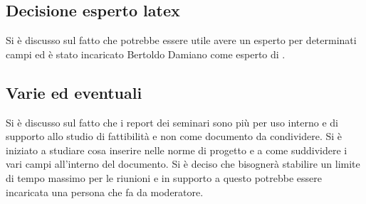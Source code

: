 \subsection*{Decisione esperto latex}
			Si è discusso sul fatto che potrebbe essere utile avere un esperto per determinati campi ed è stato incaricato Bertoldo Damiano come esperto di \glock{\LaTeX}.


\subsection*{Varie ed eventuali}
			Si è discusso sul fatto che i report dei seminari sono più per uso interno e di supporto allo studio di fattibilità e non come documento da condividere.
			Si è iniziato a studiare cosa inserire nelle norme di progetto e a come suddividere i vari campi all'interno del documento.
			Si è deciso che bisognerà stabilire un limite di tempo massimo per le riunioni e in supporto a questo potrebbe essere incaricata una persona che fa da moderatore.



